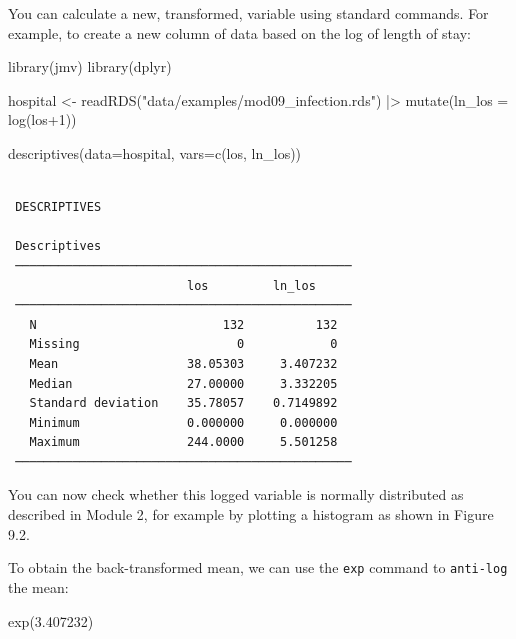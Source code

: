 \documentclass[
  a4paper,
]{memoir}
\newenvironment{Shaded}{\begin{snugshade}}{\end{snugshade}}
\newcommand{\AttributeTok}[1]{\textcolor[rgb]{0.00,0.00,0.00}{#1}}
\newcommand{\DecValTok}[1]{\textcolor[rgb]{0.00,0.00,0.00}{#1}}
\newcommand{\FloatTok}[1]{\textcolor[rgb]{0.00,0.00,0.00}{#1}}
\newcommand{\FunctionTok}[1]{\textcolor[rgb]{0.00,0.00,0.00}{#1}}
\newcommand{\NormalTok}[1]{\textcolor[rgb]{0.00,0.00,0.00}{#1}}
\newcommand{\OtherTok}[1]{\textcolor[rgb]{0.00,0.00,0.00}{#1}}
\newcommand{\SpecialCharTok}[1]{\textcolor[rgb]{0.00,0.00,0.00}{#1}}
\newcommand{\StringTok}[1]{\textcolor[rgb]{0.00,0.00,0.00}{#1}}
\begin{document}
You can calculate a new, transformed, variable using standard commands.
For example, to create a new column of data based on the log of length
of stay:

\begin{Shaded}
\begin{Highlighting}[]
\FunctionTok{library}\NormalTok{(jmv)}
\FunctionTok{library}\NormalTok{(dplyr)}

\NormalTok{hospital }\OtherTok{\textless{}{-}} \FunctionTok{readRDS}\NormalTok{(}\StringTok{"data/examples/mod09\_infection.rds"}\NormalTok{) }\SpecialCharTok{|\textgreater{}} 
  \FunctionTok{mutate}\NormalTok{(}\AttributeTok{ln\_los =} \FunctionTok{log}\NormalTok{(los}\SpecialCharTok{+}\DecValTok{1}\NormalTok{))}

\FunctionTok{descriptives}\NormalTok{(}\AttributeTok{data=}\NormalTok{hospital, }\AttributeTok{vars=}\FunctionTok{c}\NormalTok{(los, ln\_los))}
\end{Highlighting}
\end{Shaded}

\begin{verbatim}

 DESCRIPTIVES

 Descriptives                                    
 ─────────────────────────────────────────────── 
                         los         ln_los      
 ─────────────────────────────────────────────── 
   N                          132          132   
   Missing                      0            0   
   Mean                  38.05303     3.407232   
   Median                27.00000     3.332205   
   Standard deviation    35.78057    0.7149892   
   Minimum               0.000000     0.000000   
   Maximum               244.0000     5.501258   
 ─────────────────────────────────────────────── 
\end{verbatim}

You can now check whether this logged variable is normally distributed
as described in Module 2, for example by plotting a histogram as shown
in Figure 9.2.

To obtain the back-transformed mean, we can use the \texttt{exp} command
to \texttt{anti-log} the mean:

\begin{Shaded}
\begin{Highlighting}[]
\FunctionTok{exp}\NormalTok{(}\FloatTok{3.407232}\NormalTok{)}
\end{Highlighting}
\end{Shaded}
\end{document}
